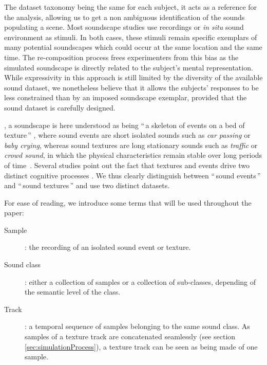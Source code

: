 \documentclass[twoside,twocolumn]{article}
\begin{document}
The dataset taxonomy being the same for each subject, it acts as a reference for the analysis, allowing us to get a non ambiguous identification of the sounds populating a scene. Most soundscape studies use recordings or \textit{in situ} sound environment as stimuli. In both cases, these stimuli remain specific exemplars of many potential soundscapes which could occur at the same location and the same time. The re-composition process frees experimenters from this bias as the simulated soundscape is directly related to the subject's mental representation. While expressivity in this approach is still limited by the diversity of the available sound dataset, we nonetheless believe that it allows the subjects' responses to be less constrained than by an imposed soundscape exemplar, provided that the sound dataset is carefully designed.

, a soundscape  is here understood as being  ``\,a skeleton of events on a bed of texture\,'' \cite{nelken_ear_2013}, where sound events are short isolated sounds such as \textit{car passing} or \textit{baby crying}, whereas sound textures are long stationary  sounds such as \textit{traffic} or \textit{crowd sound}, in which the physical characteristics remain stable over long periods of time~\cite{saint-arnaud_classification_1995}. Several studies point out the fact that textures and events drive two distinct cognitive processes \cite{maffiolo_caracterisation_1999, mcdermott2013summary}. We thus clearly distinguish between ``\,sound events\,'' and ``\,sound textures\,'' and use two distinct datasets. 

For ease of reading, we introduce some terms that will be used throughout the paper:

\begin{description}
\item[Sample]: the recording of an isolated sound event or texture.
\item[Sound class]: either a collection of samples or a collection of sub-classes, depending of the semantic level of the class.
\item[Track]: a temporal sequence of samples belonging to the same sound class. As samples of a texture track are concatenated seamlessly (see section \ref{sec:simulationProcess}), a texture track can be seen as being made of one sample.
\end{description}
\end{document}
